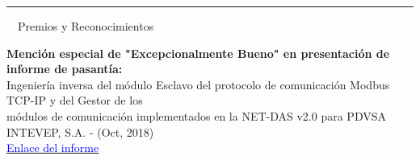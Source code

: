 \documentclass[a4paper,20pt]{article}
\makeatletter
\newcommand{\resumeSubheading}[4]{
  \vspace{-1pt}\item
    \begin{tabular*}{0.97\textwidth}{l@{\extracolsep{\fill}}r}
      \textbf{#1} & #2 \\
      \textit{#3} & \textit{#4} \\
    \end{tabular*}\vspace{-5pt}
}
\newcommand{\resumeSubHeadingListStart}{\begin{itemize}[leftmargin=*]}
\newcommand{\resumeSubHeadingListEnd}{\end{itemize}}
\makeatother
\begin{document}
\vspace{10pt}
 \textcolor{NavyBlue}{ \rule[1mm]{2cm}{2mm} {\LARGE ~~Premios y Reconocimientos}}
\vspace{2pt}
\begin{description}[font=$\bullet$]
\item {\textbf{Mención especial de "Excepcionalmente Bueno" en presentación de informe de pasantía:}}\\
 {Ingeniería inversa del módulo Esclavo del protocolo de comunicación Modbus TCP-IP y del Gestor de los \\módulos de comunicación implementados en la NET-DAS v2.0 para PDVSA INTEVEP, S.A. - (Oct, 2018)}\\
 \vspace{4pt}
 {{\href{https://drive.google.com/file/d/1bHQlD1dOGpO19o5fX3Z03ocKmDDeeF34/view}{\textcolor{Blue}{Enlace del informe}}}}

\end{description}


\end{document}
